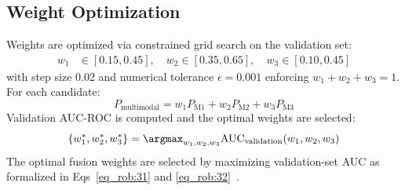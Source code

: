 \documentclass[10pt,letterpaper]{article}
\begin{document}
                                                                                                                  \subsection*{Weight Optimization}
                                                                                                                  Weights are optimized via constrained grid search on the validation set:
                                                                                                                  \begin{align}
                                                                                                                  w_1 &\in [0.15,0.45],\quad
                                                                                                                  w_2 \in [0.35,0.65],\quad
                                                                                                                  w_3 \in [0.10,0.45]
                                                                                                                   \label{eq_rob:31}\end{align}
                                                                                                                  with step size 0.02 and numerical tolerance $\epsilon=0.001$ enforcing $w_1+w_2+w_3=1$. For each candidate:
                                                                                                                  \begin{equation} \label{eq_rob:32}
                                                                                                                  P_{\text{multimodal}} = w_1 P_{\text{M1}} + w_2 P_{\text{M2}} + w_3 P_{\text{M3}}
                                                                                                                  \end{equation}
                                                                                                                  Validation AUC-ROC is computed and the optimal weights are selected:
                                                                                                                  \begin{equation} \label{eq_rob:33}
 \{w_1^*, w_2^*, w_3^*\} = \argmax_{w_1,w_2,w_3}\text{AUC}_{\text{validation}}(w_1,w_2,w_3) \end{equation}
                                                                                                                  The optimal fusion weights are selected by maximizing validation-set AUC as formalized in Eqs~\eqref{eq_rob:31} and \eqref{eq_rob:32}~\cite{ref59}.
\end{document}
